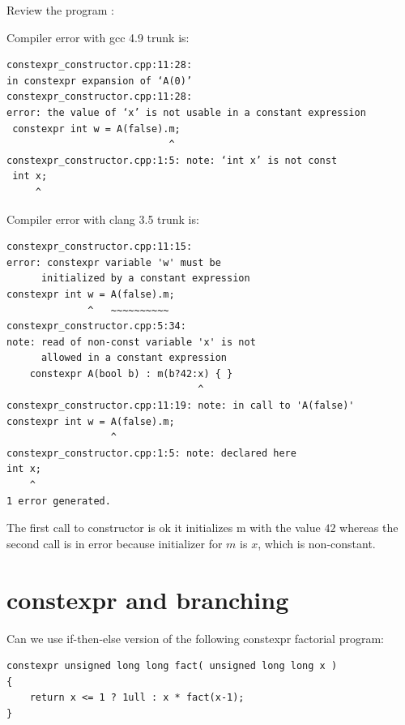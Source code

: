 \begin{Exercise}[title={constexpr constructor and initialization}, difficulty=2, label=ex017]
Review the program :

\end{Exercise}


\begin{Answer}[ref=ex017]
Compiler error with gcc 4.9 trunk is:
\begin{verbatim}
constexpr_constructor.cpp:11:28:   
in constexpr expansion of ‘A(0)’
constexpr_constructor.cpp:11:28: 
error: the value of ‘x’ is not usable in a constant expression
 constexpr int w = A(false).m;       
                            ^
constexpr_constructor.cpp:1:5: note: ‘int x’ is not const
 int x;                              
     ^
\end{verbatim}
Compiler error with clang 3.5 trunk is:
\begin{verbatim}
constexpr_constructor.cpp:11:15: 
error: constexpr variable 'w' must be
      initialized by a constant expression
constexpr int w = A(false).m;       
              ^   ~~~~~~~~~~
constexpr_constructor.cpp:5:34: 
note: read of non-const variable 'x' is not
      allowed in a constant expression
    constexpr A(bool b) : m(b?42:x) { }
                                 ^
constexpr_constructor.cpp:11:19: note: in call to 'A(false)'
constexpr int w = A(false).m;       
                  ^
constexpr_constructor.cpp:1:5: note: declared here
int x;                              
    ^
1 error generated.
\end{verbatim}
The first call to constructor is ok it initializes m with the value $42$ whereas the second call is in error because initializer for $m$ is $x$, which is non-constant.
\end{Answer}



\section{constexpr and branching}

\begin{Exercise}[title={constexpr and branching}, difficulty=2, label=ex018]
Can we use if-then-else version of the following constexpr factorial program:
\begin{lstlisting}
constexpr unsigned long long fact( unsigned long long x ) 
{
    return x <= 1 ? 1ull : x * fact(x-1);
}
\end{lstlisting}
\end{Exercise}


